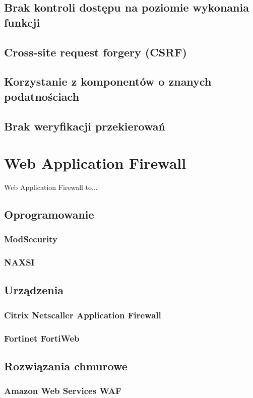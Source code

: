 \documentclass[11pt,a4paper,polish,thesis,oneside]{dcsbook}
\begin{document}
\subsection{Brak kontroli dostępu na poziomie wykonania funkcji}
\subsection{Cross-site request forgery (CSRF)}
\subsection{Korzystanie z komponentów o znanych podatnościach}
\subsection{Brak weryfikacji przekierowań}


\section{Web Application Firewall}
Web Application Firewall to...

\subsection{Oprogramowanie}
\subsubsection{ModSecurity}
\subsubsection{NAXSI}

\subsection{Urządzenia}
\subsubsection{Citrix Netscaller Application Firewall}
\subsubsection{Fortinet FortiWeb}

\subsection{Rozwiązania chmurowe}
\subsubsection{Amazon Web Services WAF}
\end{document}
